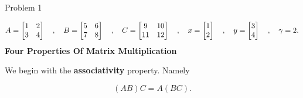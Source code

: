 \begin{problem}{Problem 1}
\begin{Highlight}[Solution]
        \setcounter{equation}{0}
        \begin{equation}
            A = 
            \begin{bmatrix}
                1 & 2 \\
                3 & 4 \\
            \end{bmatrix}
            \hspace*{10pt} , \hspace*{10pt}
            B = 
            \begin{bmatrix}
                5 & 6 \\
                7 & 8 \\
            \end{bmatrix}
            \hspace*{10pt} , \hspace*{10pt}
            C = 
            \begin{bmatrix}
                9 & 10 \\
                11 & 12 \\
            \end{bmatrix}
            \hspace*{10pt} , \hspace*{10pt}
            x = 
            \begin{bmatrix}
                1 \\
                2 \\
            \end{bmatrix}
            \hspace*{10pt} , \hspace*{10pt}
            y = 
            \begin{bmatrix}
                3 \\
                4 \\
            \end{bmatrix}
            \hspace*{10pt} , \hspace*{10pt}
            \gamma = 2.
        \end{equation}
        \noindent \textbf{Four Properties Of Matrix Multiplication} \vspace*{1em}

        We begin with the \textbf{associativity} property. Namely

        \begin{equation}
            (AB)C = A(BC).
        \end{equation}


\end{Highlight}
\end{problem}
